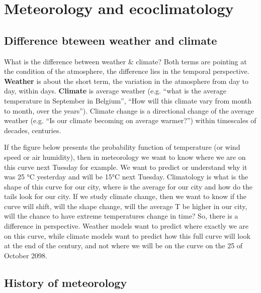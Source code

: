 \documentclass[oneside]{book}
\begin{document}
\section{Meteorology and
ecoclimatology}\label{meteorology-and-ecoclimatology}

\subsection{Difference bteween weather and
climate}\label{difference-bteween-weather-and-climate}

What is the difference between weather \& climate? Both terms are
pointing at the condition of the atmosphere, the difference lies in the
temporal perspective. \textbf{Weather} is about the short term, the
variation in the atmosphere from day to day, within days.
\textbf{Climate} is average weather (e.g. ``what is the average
temperature in September in Belgium'', ``How will this climate vary from
month to month, over the years''). Climate change is a directional
change of the average weather (e.g. ``Is our climate becoming on average
warmer?'') within timescales of decades, centuries.

If the figure below presents the probability function of temperature (or
wind speed or air humidity), then in meteorology we want to know where
we are on this curve next Tuesday for example. We want to predict or
understand why it was 25 °C yesterday and will be 15°C next Tuesday.
Climatology is what is the shape of this curve for our city, where is
the average for our city and how do the tails look for our city. If we
study climate change, then we want to know if the curve will shift, will
the shape change, will the average T be higher in our city, will the
chance to have extreme temperatures change in time? So, there is a
difference in perspective. Weather models want to predict where exactly
we are on this curve, while climate models want to predict how this full
curve will look at the end of the century, and not where we will be on
the curve on the 25 of October 2098.

\subsection{History of meteorology}\label{history-of-meteorology}
\end{document}

